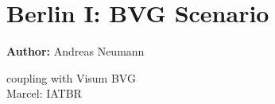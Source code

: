 \section{Berlin I: BVG Scenario}
\label{ch:scenarios:berlinI}
\hfill \textbf{Author:} Andreas Neumann

\citep[][p.67ff]{Balmer_PhDThesis_2007}

\citep[][Ch 7/8]{Neumann_PhDThesis_2014}

coupling with Visum BVG \\
Marcel: IATBR \\


